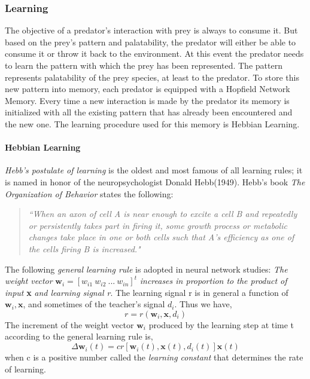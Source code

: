 \documentclass[letterpaper]{article}
\numberwithin{equation}{section}
\begin{document}
\subsubsection{Learning}
The objective of a predator's interaction with prey is always to consume it. But based on the prey's pattern and palatability, the predator will either be able to consume it or throw it back to the environment. At this event the predator needs to learn the pattern with which the prey has been represented. The pattern represents palatability of the prey species, at least to the predator. To store this new pattern into memory, each predator is equipped with a Hopfield Network Memory. Every time a new interaction is made by the predator its memory is initialized with all the existing pattern that has already been encountered and the new one. The learning procedure used for this memory is Hebbian Learning. 

\paragraph{Hebbian Learning}
\textit{Hebb's postulate of learning} is the oldest and most famous of all learning rules; it is named in honor of the neuropsychologist Donald Hebb(1949). Hebb's book \textit{The Organization of Behavior} \cite{hebb1949} states the following:

\begin{quote}
\textsl{``When an axon of cell A is near enough to excite a cell B and repeatedly or persistently takes part in firing it, some growth process or metabolic changes take place in one or both cells such that A's efficiency as one of the cells firing B is increased."}
\end{quote}

The following \textit{general learning rule} is adopted in neural network studies: \textit{The weight vector} \( \textbf{w}_i = [w_{i1} \> w_{i2} \> ... \> w_{in}]^t \) \textit{increases in proportion to the product of input} \textbf{x} \textit{and learning signal r}. The learning signal r is in general a function of \(\textbf{w}_i,\textbf{x}\), and sometimes of the teacher's signal \(d_i\). Thus we have, 
\begin{equation}
	r = r(\textbf{w}_i,\textbf{x},d_i)
\end{equation}
The increment of the weight vector \(\textbf{w}_i\) produced by the learning step at time t according to the general learning rule is,
\begin{equation}
	\Delta\textbf{w}_i(t)=cr[\textbf{w}_i(t),\textbf{x}(t),d_i(t)]\textbf{x}(t)
\end{equation}
when c is a positive number called the \textit{learning constant} that determines the rate of learning.
\end{document}
